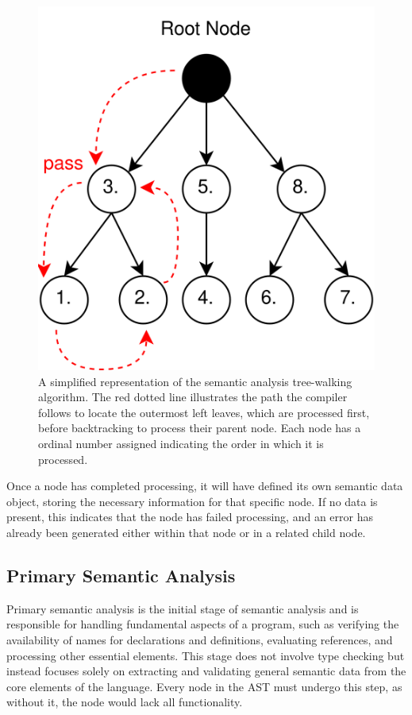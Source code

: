 \begin{figure}[h!]
	\centering
	\includegraphics[scale=1]{./pics/Semantic-Analysis-Tree-Walking.drawio}
	\caption{A simplified representation of the semantic analysis tree-walking algorithm. The red dotted line illustrates the path the compiler follows to locate the outermost left leaves, which are processed first, before backtracking to process their parent node. Each node has a ordinal number assigned indicating the order in which it is processed.}
	\label{fig:implementation:semantic-analysis-tree-walking}
\end{figure}

Once a node has completed processing, it will have defined its own semantic data object, storing the necessary information for that specific node. If no data is present, this indicates that the node has failed processing, and an error has already been generated either within that node or in a related child node.

\subsection{Primary Semantic Analysis}
\label{sec:primary-semantic-analysis}

Primary semantic analysis is the initial stage of semantic analysis and is responsible for handling fundamental aspects of a program, such as verifying the availability of names for declarations and definitions, evaluating references, and processing other essential elements. This stage does not involve type checking but instead focuses solely on extracting and validating general semantic data from the core elements of the language. Every node in the AST must undergo this step, as without it, the node would lack all functionality.

